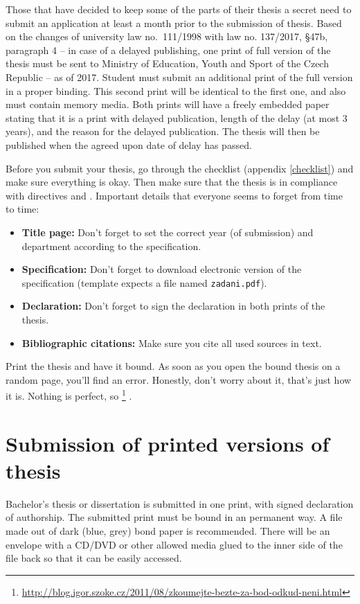 Those that have decided to keep some of the parts of their thesis a secret need to submit an application at least a month prior to the submission of thesis. Based on the changes of university law no.~111/1998 with law no. 137/2017, \S 47b, paragraph 4 -- in case of a delayed publishing, one print of full version of the thesis must be sent to Ministry of Education, Youth and Sport of the Czech Republic -- as of 2017. Student must submit an additional print of the full version in a proper binding. This second print will be identical to the first one, and also must contain memory media. Both prints will have a freely embedded paper stating that it is a print with delayed publication, length of the delay (at most 3 years), and the reason for the delayed publication. The thesis will then be published when the agreed upon date of delay has passed. 

Before you submit your thesis, go through the checklist (appendix \ref{checklist}) and make sure everything is okay. Then make sure that the thesis is in compliance with directives \cite{smernice} and \cite{smerniceFIT}. Important details that everyone seems to forget from time to time:
\begin{itemize}
	\item \textbf{Title page:}  Don't forget to set the correct year (of submission) and department according to the specification.
	\item \textbf{Specification:} Don't forget to download electronic version of the specification (template expects a file named \texttt{zadani.pdf}).
    \item \textbf{Declaration:} Don't forget to sign the declaration in both prints of the thesis.
    \item \textbf{Bibliographic citations:} Make sure you cite all used sources in text.
\end{itemize}

Print the thesis and have it bound. As soon as you open the bound thesis on a random page, you'll find an error. Honestly, don't worry about it, that's just how it is. Nothing is perfect, so \footnote{\url{http://blog.igor.szoke.cz/2011/08/zkoumejte-bezte-za-bod-odkud-neni.html}} \cite{rady}.

\section{Submission of printed versions of thesis}
Bachelor's thesis or dissertation is submitted in one print, with signed declaration of authorship. The submitted print must be bound in an permanent way. A file made out of dark (blue, grey) bond paper is recommended. There will be an envelope with a CD/DVD or other allowed media glued to the inner side of the file back so that it can be easily accessed. 

